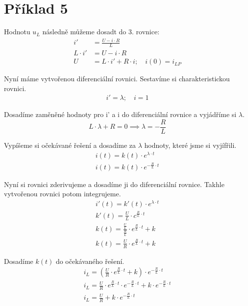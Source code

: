 

\section{Příklad 5}


Hodnotu \( u_L \) následně můžeme dosadt do 3. rovnice:
\nopagebreak
\[
\begin{aligned}
i' &= \frac{U - i \cdot R}{L} \\
L \cdot i' &= U - i \cdot R \\
U &= L \cdot i' + R \cdot i; \quad i(0) = i_{LP}
\end{aligned}
\]
\nopagebreak

Nyní máme vytvořenou diferenciální rovnici.
Sestavíme si charakteristickou rovnici.
\nopagebreak
\[
\begin{array}{l}
i' = \lambda; \quad
i = 1
\end{array}
\]

Dosadíme zaměněné hodnoty pro i' a i do diferenciální rovnice a vyjádříme si \( \lambda \).
\nopagebreak
\[
L \cdot \lambda + R = 0 \implies \lambda = -\frac{R}{L}
\]

Vypíšeme si očekávané řešení a dosadíme za \( \lambda \) hodnoty, které jsme si vyjífřili.
\nopagebreak
\[
\begin{array}{l}
i(t) = k(t) \cdot e^{\lambda \cdot t} \\
i(t) = k(t) \cdot e^{-\frac{R}{L} \cdot t}
\end{array}
\]

Nyní si rovnici zderivujeme a dosadíme ji do diferenciální rovnice. Takhle vytvořenou rovnici potom integrujeme.
\nopagebreak
\[
\begin{array}{l}
i'(t) = k'(t) \cdot e^{\lambda \cdot t} \\
k'(t) = \frac{U}{L} \cdot c^{\frac{R}{L} \cdot t} \\
k(t) = \frac{\frac{U}{L}}{\frac{R}{L}} \cdot e^{\frac{R}{L} \cdot t} + k \\
k(t) = \frac{U}{R} \cdot e^{\frac{R}{L} \cdot t} + k
\end{array}
\]

Dosadíme \( k(t) \) do očekávaného řešení.
\nopagebreak
\[
\begin{array}{l}
i_L = (\frac{U}{R} \cdot e^{\frac{R}{L} \cdot t} + k) \cdot e^{-\frac{R}{L} \cdot t} \\
i_L = \frac{U}{R} \cdot e^{\frac{R}{L} \cdot t} \cdot e^{-\frac{R}{L} \cdot t} + k \cdot e^{-\frac{R}{L} \cdot t} \\
i_L = \frac{U}{R} + k \cdot e^{-\frac{R}{L} \cdot t}
\end{array}
\]

